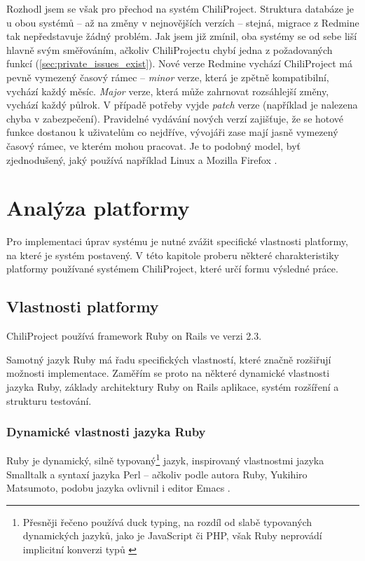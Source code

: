 \documentclass[thesis=B,czech]{FITthesis}[2012/05/02]
\begin{document}
Rozhodl jsem se však pro přechod na systém ChiliProject. Struktura databáze
je u obou systémů -- až na změny v nejnovějších verzích -- stejná,
migrace z Redmine tak nepředstavuje žádný problém. Jak jsem již zmínil,
oba systémy se od sebe liší hlavně svým směřováním, ačkoliv
ChiliProjectu chybí jedna z požadovaných funkcí
(\autoref{sec:private_issues_exist}). Nové verze Redmine vychází
 ChiliProject má pevně vymezený časový rámec
-- \emph{minor} verze, která je zpětně kompatibilní,
vychází každý měsíc. \emph{Major} verze, která může zahrnovat rozsáhlejší změny,
vychází každý půlrok. V případě potřeby vyjde \emph{patch} verze (například je nalezena chyba v zabezpečení).
Pravidelné vydávání nových verzí zajišťuje, že se hotové funkce dostanou
k uživatelům co nejdříve, vývojáři zase mají jasně vymezený časový
rámec, ve kterém mohou pracovat. Je to podobný model, byť zjednodušený,
jaký používá například Linux a Mozilla Firefox
\citep{MozillaDevProcess}.

\chapter{Analýza platformy}
\label{chap:analyza_navrh}

Pro implementaci úprav systému je nutné zvážit specifické vlastnosti
platformy, na které je systém postavený. V této kapitole proberu některé
charakteristiky platformy používané systémem ChiliProject, které určí
formu výsledné práce.

\section{Vlastnosti platformy}

ChiliProject používá framework Ruby on Rails ve verzi 2.3.

Samotný jazyk Ruby má řadu specifických vlastností, které značně
rozšiřují možnosti implementace. Zaměřím se proto na některé dynamické
vlastnosti jazyka Ruby, základy architektury Ruby on Rails aplikace,
systém rozšíření a strukturu testování.

\subsection{Dynamické vlastnosti jazyka Ruby}
\label{sec:vlastnosti-ruby}

Ruby je dynamický, silně typovaný\footnote{Přesněji řečeno používá
  \gls{duck typing}, na rozdíl od slabě typovaných dynamických jazyků,
  jako je JavaScript či PHP, však Ruby neprovádí implicitní konverzi typů
  \citep{Lamontagne2007}} jazyk, inspirovaný vlastnostmi jazyka
Smalltalk a syntaxí jazyka Perl \citep{Stewart2001} -- ačkoliv podle
autora Ruby, Yukihiro  Matsumoto, podobu jazyka ovlivnil i editor
Emacs \citep{Matsumoto2012}.
\end{document}
